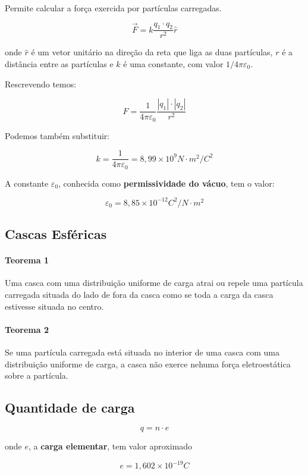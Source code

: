 Permite calcular a força exercida por partículas carregadas.

\[
\vec{F} = k \frac{q_1 \cdot q_2}{r^2} \hat{r}
\]

onde $\hat{r}$ é um vetor unitário na direção da reta que liga as duas
partículas, $r$ é a distância entre as partículas e $k$ é uma constante,
com valor $1/4 \pi \varepsilon_0$.

Rescrevendo temos:

\[
F = \frac{1}{4 \pi \varepsilon_0} \frac{|q_1| \cdot |q_2|}{r^2}
\]

Podemos também substituir:

\[
k = \frac{1}{4 \pi \varepsilon_0} = 8,99 \times 10^9 N \cdot m^2/C^2
\]

A constante $\varepsilon_0$, conhecida como \textbf{permissividade do
vácuo}, tem o valor:

\[
\varepsilon_0 = 8,85 \times 10^{-12} C^2/N \cdot m^2
\]

\subsection{Cascas Esféricas}\label{cascas-esfuxe9ricas}

\paragraph{Teorema 1}\label{teorema-1-1}

Uma casca com uma distribuição uniforme de carga atrai ou repele uma
partícula carregada situada do lado de fora da casca como se toda a
carga da casca estivesse situada no centro.

\paragraph{Teorema 2}\label{teorema-2}

Se uma partícula carregada está situada no interior de uma casca com uma
distribuição uniforme de carga, a casca não exerce nehuma força
eletroestática sobre a partícula.

\subsection{Quantidade de carga}\label{quantidade-de-carga}

\[
q = n \cdot e
\]

onde $e$, a \textbf{carga elementar}, tem valor aproximado

\[
e = 1,602 \times 10^{-19} C
\]
